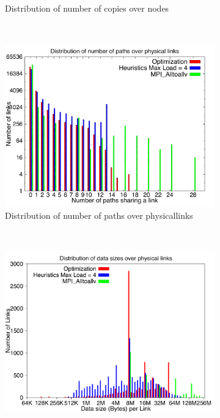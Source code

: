 \begin{figure}[!htbp]
\begin{subfigure}[b]{0.49\textwidth}
                \caption{Distribution of number of copies over nodes}
                \label{fig:3_4096_copy}
        \end{subfigure}
        ~ %
        \begin{subfigure}[b]{0.49\textwidth}
                \includegraphics[width=\textwidth]{report_figures/constantr/3_4096/loadpath_histo.pdf}
                \caption{Distribution of number of paths over physicallinks}
                \label{fig:3_4096_loadpath}
        \end{subfigure}
        ~ %
        \begin{subfigure}[b]{0.49\textwidth}
                \includegraphics[width=\textwidth]{report_figures/constantr/3_4096/loaddata_histo.pdf}

\end{subfigure}
\end{figure}
